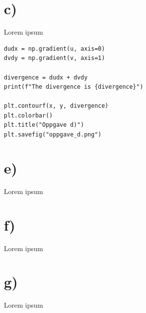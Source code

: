 \documentclass[a4paper,10pt,norsk]{article}
\begin{document}
	\section*{c)}\label{ass:d}
	Lorem ipsum
	\begin{lstlisting}
dudx = np.gradient(u, axis=0)
dvdy = np.gradient(v, axis=1)

divergence = dudx + dvdy
print(f"The divergence is {divergence}")

plt.contourf(x, y, divergence)
plt.colorbar()
plt.title("Oppgave d)")
plt.savefig("oppgave_d.png")
	\end{lstlisting}

	\section*{e)}\label{ass:e}
	Lorem ipsum

	\section*{f)}\label{ass:f}
	Lorem ipsum

	\section*{g)}\label{ass:g}
	Lorem ipsum
\end{document}
